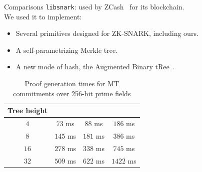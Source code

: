 \documentclass[beamer={10pt,xcolor=dvipsnames},target=mst]{thud}
\begin{document}
\begin{frame}{Comparisons}
  \texttt{libsnark}: used by ZCash~\cite{SassonCGGMTV2014} for its blockchain.\\
  We used it to implement:
  \begin{itemize}
    \item Several primitives designed for ZK-SNARK, including ours.
    \item A self-parametrizing Merkle tree.
    \item A new mode of hash, the Augmented Binary tRee~\cite{AndreevaBR2021}.
  \end{itemize}
  \begin{table}
    \caption*{Proof generation times for MT commitments over 256-bit prime fields}
    \centering
        \begin{tabular}{c c c c}  
          \toprule
          Tree height & \Aarionhash{} & \Griffin{} & \Poseidon{} \\
          \midrule
          \(4\)   & \(73\) ms  & \(88\) ms & \(186\) ms  \\
          \(8\)   & \(145\) ms & \(181\) ms & \(386\) ms  \\
          \(16\)  & \(278\) ms & \(338\) ms & \(745\) ms  \\
          \(32\)  & \(509\) ms & \(622\) ms & \(1422\) ms \\
          \bottomrule
        \end{tabular}
  \end{table}
\end{frame}

\begin{frame}[allowframebreaks]  
  
  
\end{frame}
\end{document}

